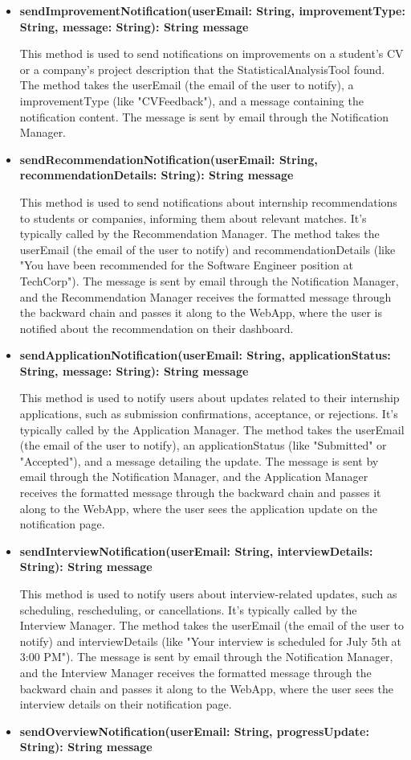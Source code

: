 \begin{itemize}
\begin{itemize}
    \item \textbf{sendImprovementNotification(userEmail: String, improvementType: String, message: String): String message
}

    This method is used to send notifications on improvements on a student's CV or a company's project description that the StatisticalAnalysisTool found.
    The method takes the userEmail (the email of the user to notify), a improvementType (like "CVFeedback"), and a message containing the notification content. The message is sent by email through the Notification Manager.
    \item \textbf{sendRecommendationNotification(userEmail: String, recommendationDetails: String): String message
}

    This method is used to send notifications about internship recommendations to students or companies, informing them about relevant matches. It’s typically called by the Recommendation Manager.
    The method takes the userEmail (the email of the user to notify) and recommendationDetails (like "You have been recommended for the Software Engineer position at TechCorp"). The message is sent by email through the Notification Manager, and the Recommendation Manager receives the formatted message through the backward chain and passes it along to the WebApp, where the user is notified about the recommendation on their dashboard.
    \item \textbf{sendApplicationNotification(userEmail: String, applicationStatus: String, message: String): String message}

    This method is used to notify users about updates related to their internship applications, such as submission confirmations, acceptance, or rejections. It’s typically called by the Application Manager.
    The method takes the userEmail (the email of the user to notify), an applicationStatus (like "Submitted" or "Accepted"), and a message detailing the update. The message is sent by email through the Notification Manager, and the Application Manager receives the formatted message through the backward chain and passes it along to the WebApp, where the user sees the application update on the notification page.
    \item \textbf{sendInterviewNotification(userEmail: String, interviewDetails: String): String message}

    This method is used to notify users about interview-related updates, such as scheduling, rescheduling, or cancellations. It’s typically called by the Interview Manager.
    The method takes the userEmail (the email of the user to notify) and interviewDetails (like "Your interview is scheduled for July 5th at 3:00 PM"). The message is sent by email through the Notification Manager, and the Interview Manager receives the formatted message through the backward chain and passes it along to the WebApp, where the user sees the interview details on their notification page.
    \item \textbf{sendOverviewNotification(userEmail: String, progressUpdate: String): String message}


\end{itemize}
\end{itemize}

